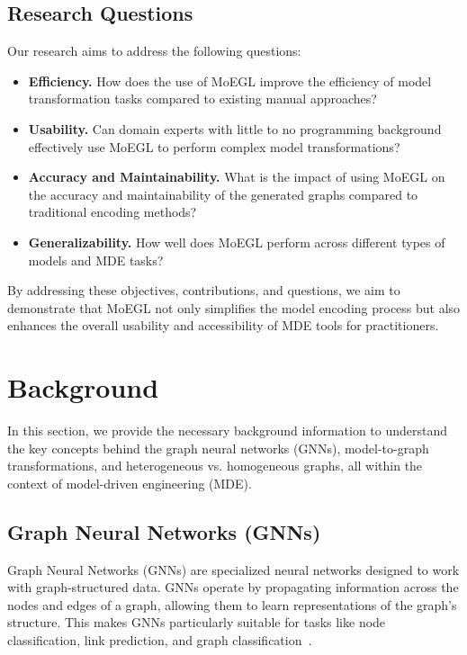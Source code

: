 \documentclass[journal,article,submit,moreauthors,technologies]{Definitions/mdpi}
\begin{document}
\subsection{Research Questions}
Our research aims to address the following questions:
\begin{itemize}
    \item \textbf{Efficiency.} How does the use of MoEGL improve the efficiency of model transformation tasks compared to existing manual approaches?
    \item \textbf{Usability.} Can domain experts with little to no programming background effectively use MoEGL to perform complex model transformations?
    \item \textbf{Accuracy and Maintainability.} What is the impact of using MoEGL on the accuracy and maintainability of the generated graphs compared to traditional encoding methods?
    \item \textbf{Generalizability.} How well does MoEGL perform across different types of models and MDE tasks?
\end{itemize}

By addressing these objectives, contributions, and questions, we aim to demonstrate that MoEGL not only simplifies the model encoding process but also enhances the overall usability and accessibility of MDE tools for practitioners.


\section{Background} \label{Sec:background}
In this section, we provide the necessary background information to understand the key concepts behind the graph neural networks (GNNs), model-to-graph transformations, and heterogeneous vs. homogeneous graphs, all within the context of model-driven engineering (MDE).

\subsection{Graph Neural Networks (GNNs)} \label{sec:gnns}
Graph Neural Networks (GNNs) are specialized neural networks designed to work with graph-structured data. GNNs operate by propagating information across the nodes and edges of a graph, allowing them to learn representations of the graph's structure. This makes GNNs particularly suitable for tasks like node classification, link prediction, and graph classification~\cite{scarselli2008graph}.
\end{document}
